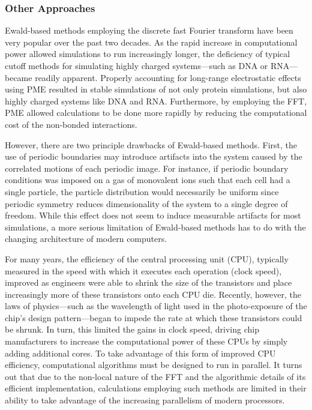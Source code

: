 \subsubsection{Other Approaches}

Ewald-based methods employing the discrete fast Fourier transform have been very
popular over the past two decades. As the rapid increase in computational power
allowed simulations to run increasingly longer, the deficiency of typical cutoff
methods for simulating highly charged systems---such as DNA or RNA---became
readily apparent. \cite{Miaskiewicz_JAmChemSoc_1993_v115_p1526,
McConnell_JAmChemSoc_1994_v116_p4461} Properly accounting for long-range
electrostatic effects using PME resulted in stable simulations of not only
protein simulations, but also highly charged systems like DNA and RNA.
\cite{Cheatham_JAmChemSoc_1995_v117_p4193} Furthermore, by employing the FFT,
PME allowed calculations to be done more rapidly by reducing the computational
cost of the non-bonded interactions.

However, there are two principle drawbacks of Ewald-based methods. First, the
use of periodic boundaries may introduce artifacts into the system caused by the
correlated motions of each periodic image.
\cite{Hunenberger_JChemPhys_1999_v110_p1856} For instance, if periodic boundary
conditions was imposed on a gas of monovalent ions such that each cell had a
single particle, the particle distribution would necessarily be uniform since
periodic symmetry reduces dimensionality of the system to a single degree of
freedom.  While this effect does not seem to induce measurable artifacts for
most simulations, \cite{Hunenberger_JChemPhys_1999_v110_p1856} a more serious
limitation of Ewald-based methods has to do with the changing architecture of
modern computers.

For many years, the efficiency of the central processing unit (CPU), typically
measured in the speed with which it executes each operation (\ie clock speed),
improved as engineers were able to shrink the size of the transistors and place
increasingly more of these transistors onto each CPU die. Recently, however, the
laws of physics---such as the wavelength of light used in the photo-exposure of
the chip's design pattern---began to impede the rate at which these transistors
could be shrunk. In turn, this limited the gains in clock speed, driving chip
manufacturers to increase the computational power of these CPUs by simply adding
additional cores. To take advantage of this form of improved CPU efficiency,
computational algorithms must be designed to run in parallel. It turns out that
due to the non-local nature of the FFT and the algorithmic details of its
efficient implementation, calculations employing such methods are limited in
their ability to take advantage of the increasing parallelism of modern
processors.

